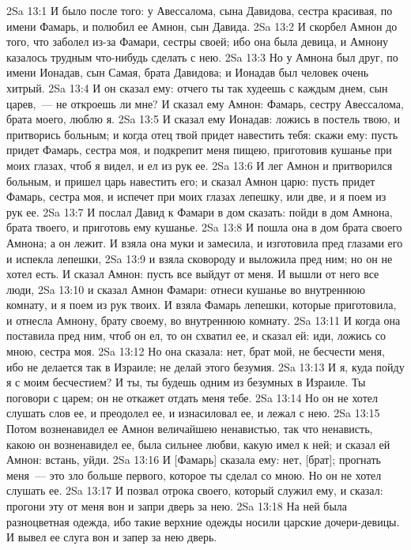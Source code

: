 \vs 2Sa 13:1 И было после того: у Авессалома, сына Давидова,  сестра красивая, по имени Фамарь, и полюбил ее Амнон, сын Давида.
\vs 2Sa 13:2 И скорбел Амнон до того, что заболел из-за Фамари, сестры своей; ибо она была девица, и Амнону казалось трудным что-нибудь сделать с нею.
\vs 2Sa 13:3 Но у Амнона был друг, по имени Ионадав, сын Самая, брата Давидова; и Ионадав был человек очень хитрый.
\vs 2Sa 13:4 И он сказал ему: отчего ты так худеешь с каждым днем, сын царев,~--- не откроешь ли мне? И сказал ему Амнон: Фамарь, сестру Авессалома, брата моего, люблю я.
\vs 2Sa 13:5 И сказал ему Ионадав: ложись в постель твою, и притворись больным; и когда отец твой придет навестить тебя: скажи ему: пусть придет Фамарь, сестра моя, и подкрепит меня пищею, приготовив кушанье при моих глазах, чтоб я видел, и ел из рук ее.
\vs 2Sa 13:6 И лег Амнон и притворился больным, и пришел царь навестить его; и сказал Амнон царю: пусть придет Фамарь, сестра моя, и испечет при моих глазах лепешку, или две, и я поем из рук ее.
\vs 2Sa 13:7 И послал Давид к Фамари в дом сказать: пойди в дом Амнона, брата твоего, и приготовь ему кушанье.
\vs 2Sa 13:8 И пошла она в дом брата своего Амнона; а он лежит. И взяла она муки и замесила, и изготовила пред глазами его и испекла лепешки,
\vs 2Sa 13:9 и взяла сковороду и выложила пред ним; но он не хотел есть. И сказал Амнон: пусть все выйдут от меня. И вышли от него все люди,
\vs 2Sa 13:10 и сказал Амнон Фамари: отнеси кушанье во внутреннюю комнату, и я поем из рук твоих. И взяла Фамарь лепешки, которые приготовила, и отнесла Амнону, брату своему, во внутреннюю комнату.
\vs 2Sa 13:11 И когда она поставила пред ним, чтоб он ел, то он схватил ее, и сказал ей: иди, ложись со мною, сестра моя.
\vs 2Sa 13:12 Но она сказала: нет, брат мой, не бесчести меня, ибо не делается так в Израиле; не делай этого безумия.
\vs 2Sa 13:13 И я, куда пойду я с моим бесчестием? И ты, ты будешь одним из безумных в Израиле. Ты поговори с царем; он не откажет отдать меня тебе.
\vs 2Sa 13:14 Но он не хотел слушать слов ее, и преодолел ее, и изнасиловал ее, и лежал с нею.
\vs 2Sa 13:15 Потом возненавидел ее Амнон величайшею ненавистью, так что ненависть, какою он возненавидел ее, была сильнее любви, какую имел к ней; и сказал ей Амнон: встань, уйди.
\vs 2Sa 13:16 И [Фамарь] сказала ему: нет, [брат]; прогнать меня~--- это зло больше первого, которое ты сделал со мною. Но он не хотел слушать ее.
\vs 2Sa 13:17 И позвал отрока своего, который служил ему, и сказал: прогони эту от меня вон и запри дверь за нею.
\vs 2Sa 13:18 На ней была разноцветная одежда, ибо такие верхние одежды носили царские дочери-девицы. И вывел ее слуга вон и запер за нею дверь.

